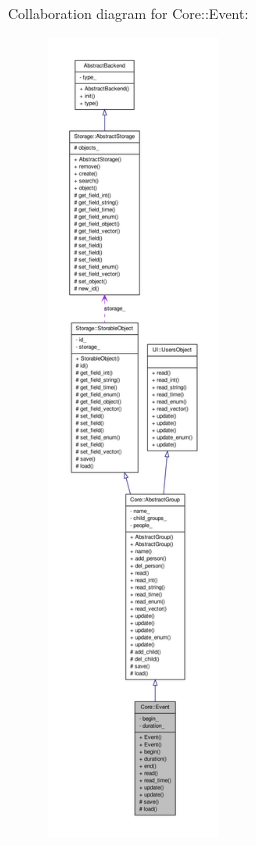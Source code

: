 Collaboration diagram for Core::Event:
\nopagebreak
\begin{figure}[H]
\begin{center}
\leavevmode
\includegraphics[height=600pt]{d2/d72/classCore_1_1Event__coll__graph}
\end{center}
\end{figure}
